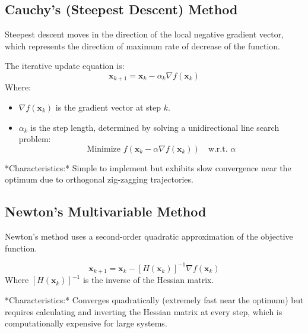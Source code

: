 \documentclass[12pt,a4paper]{article}
\begin{document}
\subsection{Cauchy's (Steepest Descent) Method}
Steepest descent moves in the direction of the local negative gradient vector, which represents the direction of maximum rate of decrease of the function.

\begin{tcolorbox}[formulabox, title={Steepest Descent Formulation}]
The iterative update equation is:
\begin{equation}
  \mathbf{x}_{k+1} = \mathbf{x}_k - \alpha_k \nabla f(\mathbf{x}_k)
\end{equation}
Where:
\begin{itemize}[leftmargin=*, itemsep=2pt, topsep=0pt]
  \item $\nabla f(\mathbf{x}_k)$ is the gradient vector at step $k$.
  \item $\alpha_k$ is the step length, determined by solving a unidirectional line search problem:
    \begin{equation}
      \text{Minimize } f(\mathbf{x}_k - \alpha \nabla f(\mathbf{x}_k)) \quad \text{w.r.t. } \alpha
    \end{equation}
\end{itemize}
*Characteristics:* Simple to implement but exhibits slow convergence near the optimum due to orthogonal zig-zagging trajectories.
\end{tcolorbox}

\subsection{Newton's Multivariable Method}
Newton's method uses a second-order quadratic approximation of the objective function.

\begin{tcolorbox}[formulabox, title={Newton's Multivariable Update}]
\begin{equation}
  \mathbf{x}_{k+1} = \mathbf{x}_k - [H(\mathbf{x}_k)]^{-1} \nabla f(\mathbf{x}_k)
\end{equation}
Where $[H(\mathbf{x}_k)]^{-1}$ is the inverse of the Hessian matrix.
\par\vspace{3pt}
*Characteristics:* Converges quadratically (extremely fast near the optimum) but requires calculating and inverting the Hessian matrix at every step, which is computationally expensive for large systems.
\end{tcolorbox}
\end{document}
